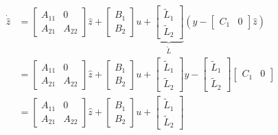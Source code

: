 \[
    \begin{split}
        \dot{\hat{z}} & = 
        \begin{bmatrix}
            A_{11} & 0 \\ 
            A_{21} & A_{22}
        \end{bmatrix} \hat{z} +
        \begin{bmatrix}
            B_{1} \\ B_{2}
        \end{bmatrix} u +
        \underbrace{
            \begin{bmatrix}
                \tilde{L}_{1} \\ \tilde{L}_{2}
            \end{bmatrix}
        }_{\tilde{L}}
        (y - \begin{bmatrix}
                C_{1} & 0
             \end{bmatrix} \hat{z} ) \\
        & = 
        \begin{bmatrix}
            A_{11} & 0 \\ 
            A_{21} & A_{22}
        \end{bmatrix} \hat{z} +
        \begin{bmatrix}
            B_{1} \\ B_{2}
        \end{bmatrix} u +
        \begin{bmatrix}
            \tilde{L}_{1} \\ \tilde{L}_{2}
        \end{bmatrix} y -
        \begin{bmatrix}
            \tilde{L}_{1} \\ \tilde{L}_{2}
        \end{bmatrix}
        \begin{bmatrix}
            C_{1} & 0
        \end{bmatrix} \\
        & = 
        \begin{bmatrix}
            A_{11} & 0 \\ 
            A_{21} & A_{22}
        \end{bmatrix} \hat{z} +
        \begin{bmatrix}
            B_{1} \\ B_{2}
        \end{bmatrix} u +
        \begin{bmatrix}
            \tilde{L}_{1} \\ \tilde{L}_{2}

\end{bmatrix}
\end{split}\]
